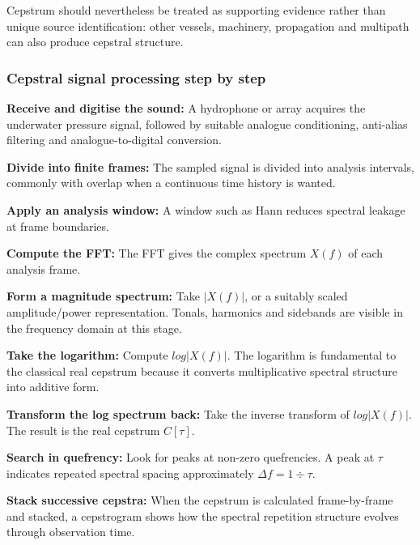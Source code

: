 \begin{advisory}
    Cepstrum should nevertheless be treated as supporting evidence rather than unique source identification: other vessels, machinery, propagation and multipath can also produce cepstral structure.
\end{advisory}

\subsubsection{Cepstral signal processing step by step}

\begin{compactenum}
    \item \textbf{Receive and digitise the sound: }A hydrophone or array acquires the underwater pressure signal, followed by suitable analogue conditioning, anti-alias filtering and analogue-to-digital conversion.
    \item \textbf{Divide into finite frames: }The sampled signal is divided into analysis intervals, commonly with overlap when a continuous time history is wanted.
    \item \textbf{Apply an analysis window: }A window such as Hann reduces spectral leakage at frame boundaries.
    \item \textbf{Compute the FFT: }The FFT gives the complex spectrum $X(f)$ of each analysis frame.
    \item \textbf{Form a magnitude spectrum: }Take $|X(f)|$, or a suitably scaled amplitude/power representation. Tonals, harmonics and sidebands are visible in the frequency domain at this stage.
    \item \textbf{Take the logarithm: }Compute $log|X(f)|$. The logarithm is fundamental to the classical real cepstrum because it converts multiplicative spectral structure into additive form.
    \item \textbf{Transform the log spectrum back: }Take the inverse transform of $log|X(f)|$. The result is the real cepstrum $C[\tau]$.
    \item \textbf{Search in quefrency: }Look for peaks at non-zero quefrencies. A peak at $\tau$ indicates repeated spectral spacing approximately $\Delta f = 1\div \tau$.
    \item \textbf{Stack successive cepstra: }When the cepstrum is calculated frame-by-frame and stacked, a cepstrogram shows how the spectral repetition structure evolves through observation time.
\end{compactenum}

